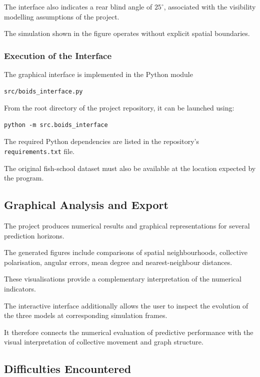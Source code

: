 \documentclass[10pt,a4paper]{article}
\begin{document}
The interface also indicates
a rear blind angle of $25^\circ$,
associated with the visibility
modelling assumptions of the project.

The simulation shown in the
figure operates without
explicit spatial boundaries.

\subsubsection*{Execution of the Interface}

The graphical interface is implemented
in the Python module

\begin{verbatim}
src/boids_interface.py
\end{verbatim}

From the root directory of the
project repository, it can be
launched using:

\begin{verbatim}
python -m src.boids_interface
\end{verbatim}

The required Python dependencies
are listed in the repository's
\texttt{requirements.txt} file.

The original fish-school dataset
must also be available at the
location expected by the program.

\subsection{Graphical Analysis and Export}

The project produces numerical results
and graphical representations for several
prediction horizons.

The generated figures include comparisons
of spatial neighbourhoods, collective
polarisation, angular errors, mean degree
and nearest-neighbour distances.

These visualisations provide a complementary
interpretation of the numerical indicators.

The interactive interface additionally
allows the user to inspect the evolution
of the three models at corresponding
simulation frames.

It therefore connects the numerical
evaluation of predictive performance
with the visual interpretation of
collective movement and graph structure.

\subsection{Difficulties Encountered}
\end{document}
